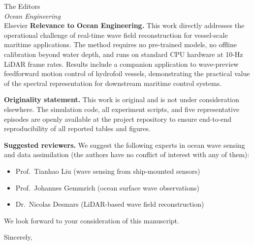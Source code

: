 \documentclass[11pt, a4paper]{letter}
\begin{document}
\begin{letter}{%
The Editors\\
\textit{Ocean Engineering}\\
Elsevier
}
\textbf{Relevance to Ocean Engineering.}
This work directly addresses the operational challenge of real-time
wave field reconstruction for vessel-scale maritime applications.
The method requires no pre-trained models, no offline calibration beyond
water depth, and runs on standard CPU hardware at 10-Hz LiDAR frame rates.
Results include a companion application to wave-preview feedforward
motion control of hydrofoil vessels, demonstrating the practical value
of the spectral representation for downstream maritime control systems.

\textbf{Originality statement.}
This work is original and is not under consideration elsewhere.
The simulation code, all experiment scripts, and five representative
episodes are openly available at the project repository to ensure
end-to-end reproducibility of all reported tables and figures.

\textbf{Suggested reviewers.}
We suggest the following experts in ocean wave sensing and data
assimilation (the authors have no conflict of interest with any of them):
\begin{itemize}
  \item Prof.\ Tianhao Liu (wave sensing from ship-mounted sensors)
  \item Prof.\ Johannes Gemmrich (ocean surface wave observations)
  \item Dr.\ Nicolas Desmars (LiDAR-based wave field reconstruction)
\end{itemize}

We look forward to your consideration of this manuscript.

\closing{Sincerely,}

\end{letter}
\end{document}
